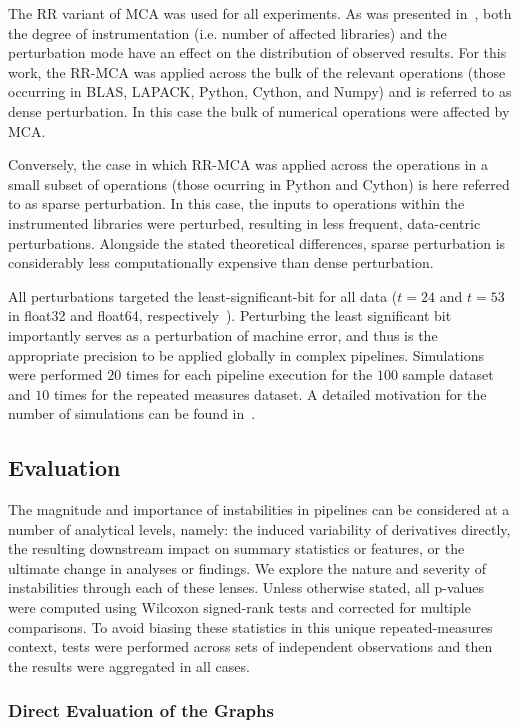 \documentclass[10pt,letterpaper]{article}
\begin{document}
The RR variant of MCA was used for all experiments. As was presented
in~\cite{Kiar2020-lb}, both the degree of instrumentation (i.e. number of affected
libraries) and the perturbation mode have an effect on the distribution of observed
results. For this work, the RR-MCA was applied across the bulk of the relevant
operations (those occurring in BLAS, LAPACK, Python, Cython, and Numpy) and is 
referred to as dense perturbation. In this case the bulk of numerical operations
were affected by MCA.

Conversely, the case in which RR-MCA was applied across the operations in a small
subset of operations (those ocurring in Python and Cython) is here referred to as
sparse perturbation. In this case, the inputs to operations within the instrumented
libraries were perturbed, resulting in less frequent, data-centric perturbations.
Alongside the stated theoretical differences, sparse perturbation is considerably
less computationally expensive than dense perturbation.

All perturbations targeted the least-significant-bit for all data ($t=24$ and $t=53$
in float32 and float64, respectively~\cite{Denis2016-wo}). Perturbing the least
significant bit importantly serves as a perturbation of machine error, and thus is
the appropriate precision to be applied globally in complex pipelines. Simulations
were performed $20$ times for each pipeline execution for the $100$ sample dataset
and $10$ times for the repeated measures dataset. A detailed motivation for the
number of simulations can be found in~\cite{Sohier2018-ts}.


\subsection*{Evaluation}

The magnitude and importance of instabilities in pipelines can be considered at a
number of analytical levels, namely: the induced variability of derivatives directly, 
the resulting downstream impact on summary statistics or features, or the ultimate
change in analyses or findings. We explore the nature and severity of instabilities
through each of these lenses. Unless otherwise stated, all p-values were computed
using Wilcoxon signed-rank tests and corrected for multiple comparisons. To avoid
biasing these statistics in this unique repeated-measures context, tests were
performed across sets of independent observations and then the results were
aggregated in all cases.

\subsubsection*{Direct Evaluation of the Graphs}
\end{document}
